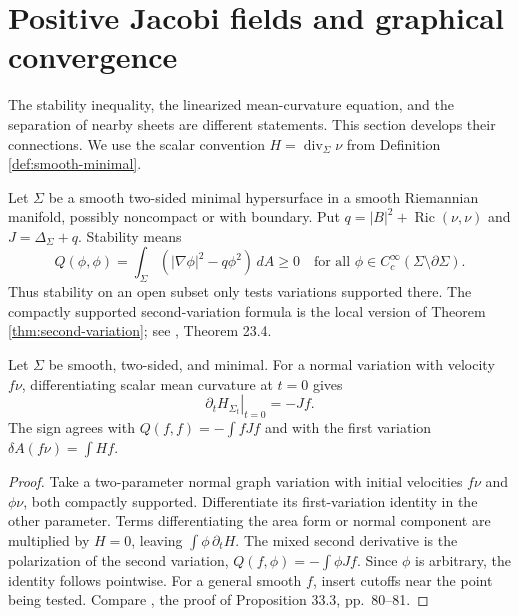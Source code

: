 \chapter{Positive Jacobi fields and graphical convergence}\label{sec:positive-jacobi}
The stability inequality, the linearized mean-curvature equation, and the separation of nearby sheets are different statements. This section develops their connections. We use the scalar convention $H=\operatorname{div}_\Sigma\nu$ from Definition \ref{def:smooth-minimal}.

\begin{definition}\label{def:local-stability}
Let $\Sigma$ be a smooth two-sided minimal hypersurface in a smooth Riemannian manifold, possibly noncompact or with boundary. Put $q=|B|^2+\operatorname{Ric}(\nu,\nu)$ and $J=\Delta_\Sigma+q$. Stability means
\[
 Q(\phi,\phi)=\int_\Sigma(|\nabla\phi|^2-q\phi^2)\,dA\geq0
 \quad\text{for all }\phi\in C_c^\infty(\Sigma\setminus\partial\Sigma).
\]
Thus stability on an open subset only tests variations supported there. The compactly supported second-variation formula is the local version of Theorem \ref{thm:second-variation}; see \cite{ChMin}, Theorem 23.4.
\end{definition}

\begin{proposition}\label{prop:mean-curvature-linearization}
Let $\Sigma$ be smooth, two-sided, and minimal. For a normal variation with velocity $f\nu$, differentiating scalar mean curvature at $t=0$ gives
\[
 \left.\partial_t H_{\Sigma_t}\right|_{t=0}=-Jf.
\]
The sign agrees with $Q(f,f)=-\int fJf$ and with the first variation $\delta A(f\nu)=\int Hf$.
\end{proposition}
\begin{proof}
Take a two-parameter normal graph variation with initial velocities $f\nu$ and $\phi\nu$, both compactly supported. Differentiate its first-variation identity in the other parameter. Terms differentiating the area form or normal component are multiplied by $H=0$, leaving $\int\phi\,\partial_tH$. The mixed second derivative is the polarization of the second variation, $Q(f,\phi)=-\int\phi Jf$. Since $\phi$ is arbitrary, the identity follows pointwise. For a general smooth $f$, insert cutoffs near the point being tested. Compare \cite{ChMin}, the proof of Proposition 33.3, pp.~80--81.
\end{proof}

